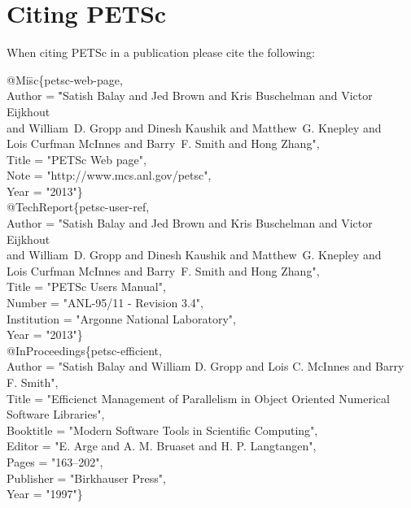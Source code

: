 
\section{Citing PETSc}

When citing PETSc in a publication please cite the following:
\begin{tabbing}

@Mi\=sc\{petsc-web-page,\\
   \>Author = \= "Satish Balay and Jed Brown and Kris Buschelman and Victor Eijkhout \\
\> \> and William~D. Gropp and Dinesh Kaushik and Matthew~G. Knepley and \\
\> \> Lois Curfman McInnes and Barry~F. Smith and Hong Zhang",\\
   \>Title  = "{PETS}c {W}eb page",\\
   \>Note   = "http://www.mcs.anl.gov/petsc",\\
   \>Year   = "2013"\}\\

@TechReport\{petsc-user-ref,\\
   \>Author      = "Satish Balay and Jed Brown and Kris Buschelman and Victor Eijkhout \\
\> \> and William~D. Gropp and Dinesh Kaushik and Matthew~G. Knepley and \\
\> \> Lois Curfman McInnes and Barry~F. Smith and Hong Zhang",\\
   \>Title       = "PETSc Users Manual",\\
   \>Number      = "ANL-95/11 - Revision 3.4",\\
   \>Institution = "Argonne National Laboratory",\\
   \>Year        = "2013"\}\\

@InProceedings\{petsc-efficient,\\
   \>Author    = "Satish Balay and William D. Gropp and Lois C. McInnes and Barry F. Smith",\\
   \>Title     = "Efficienct Management of Parallelism in Object Oriented Numerical Software Libraries",\\
   \>Booktitle = "Modern Software Tools in Scientific Computing",\\
   \>Editor    = "E. Arge and A. M. Bruaset and H. P. Langtangen",\\
   \>Pages     = "163--202",\\
   \>Publisher = "Birkhauser Press",\\
   \>Year      = "1997"\}
\end{tabbing}


